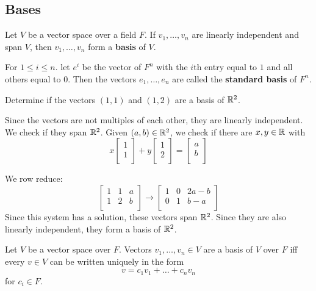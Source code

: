 \documentclass{article}
\begin{document}
  \subsection{Bases}
  \begin{definition}
    Let $V$ be a vector space over a field $F$. If $v_1, \ldots, v_n$ are linearly independent and span $V$, then $v_1, \ldots, v_n$ form a \textbf{basis} of $V$.
  \end{definition}
  \begin{definition}
    For $1 \leq i \leq n$. let $e^i$ be the vector of $F^n$ with the $i$th entry equal to $1$ and all others equal to $0$. Then the vectors $e_1, \ldots, e_n$ are called the \textbf{standard basis} of $F^n$.
  \end{definition}
  \begin{example}
    Determine if the vectors $(1, 1)$ and $(1, 2)$ are a basis of $\mathbb{R}^2$.

    Since the vectors are not multiples of each other, they are linearly independent.
    We check if they span $\mathbb{R}^2$. Given $(a, b) \in \mathbb{R}^2$, we check if there are $x, y \in \mathbb{R}$ with
    \[
      x
      \begin{bmatrix}
        1\\1\\
      \end{bmatrix} + y
      \begin{bmatrix}
        1\\2\\
      \end{bmatrix} =
      \begin{bmatrix}
        a\\b\\
      \end{bmatrix}
    \]

    We row reduce:
    \[
      \begin{bmatrix}
        1 & 1 & a\\
        1 & 2 & b\\
      \end{bmatrix} \to
      \begin{bmatrix}
        1 & 0 & 2a - b\\
        0 & 1 & b - a\\
      \end{bmatrix}
    \]
    Since this system has a solution, these vectors span $\mathbb{R}^2$. Since they are also linearly independent, they form a basis of $\mathbb{R}^2$.
  \end{example}
  \begin{cthm}
    Let $V$ be a vector space over $F$. Vectors $v_1, \ldots, v_n \in V$ are a basis of $V$ over $F$ iff every $v \in V$ can be written uniquely in the form \[
      v = c_1v_1 + \dots + c_nv_n
    \]
    for $c_i \in F$.
  \end{cthm}
\end{document}
